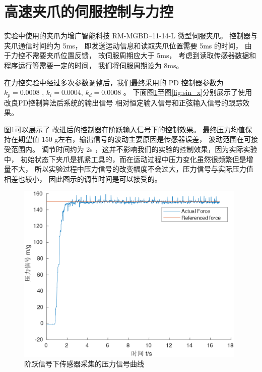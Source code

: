 \section{高速夹爪的伺服控制与力控}
实验中使用的夹爪为增广智能科技 RM-MGBD--11-14-L 微型伺服夹爪。
控制器与夹爪通信时间约为 5ms， 即发送运动信息和读取夹爪位置需要 5ms 的时间，
由于力控不需要夹爪位置反馈， 故伺服周期应大于 5ms，
考虑到读取传感器数据和程序运行等需要一定的时间， 我们将伺服周期设为 8ms。

在力控实验中经过多次参数调整后，我们最终采用的 PD 控制器参数为
$k_p = 0.0008$ , $k_i = 0.0004$, $k_d = 0.0008$ 。
下面图\ref{fig:150}至图\ref{fig:sin_x}分别展示了使用改良PD控制算法后系统的输出信号
相对恒定输入信号和正弦输入信号的跟踪效果。





图\ref{fig:150}可以展示了 改进后的控制器在阶跃输入信号下的控制效果。
最终压力均值保持在期望值 150 g左右，输出信号的波动主要原因是传感器误差，
波动范围在可接受范围内。
调节时间约为 2s ，这并不影响我们的实验的控制效果，因为实际实验中，
初始状态下夹爪是抓紧工具的，而在运动过程中压力变化虽然很频繁但是增量不大，
所以实验过程中压力信号的改变幅度不会过大，压力信号与实际压力值相差也较小，
因此图示的调节时间是可以接受的。

\begin{figure}[!ht]
  \centering
  \includegraphics[width=11cm]{chapter04/pic/150}
  \caption{\label{fig:150}
    阶跃信号下传感器采集的压力信号曲线}
  \vspace{-0.3cm}
\end{figure}

